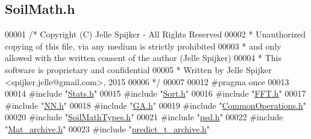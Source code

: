 \hypertarget{_soil_math_8h_source}{}\subsection{Soil\+Math.\+h}
\label{_soil_math_8h_source}

\begin{DoxyCode}
00001 \textcolor{comment}{/* Copyright (C) Jelle Spijker - All Rights Reserved}
00002 \textcolor{comment}{ * Unauthorized copying of this file, via any medium is strictly prohibited}
00003 \textcolor{comment}{ * and only allowed with the written consent of the author (Jelle Spijker)}
00004 \textcolor{comment}{ * This software is proprietary and confidential}
00005 \textcolor{comment}{ * Written by Jelle Spijker <spijker.jelle@gmail.com>, 2015}
00006 \textcolor{comment}{ */}
00007 
00012 \textcolor{preprocessor}{#pragma once}
00013 
00014 \textcolor{preprocessor}{#include "\hyperlink{_stats_8h}{Stats.h}"}
00015 \textcolor{preprocessor}{#include "\hyperlink{_sort_8h}{Sort.h}"}
00016 \textcolor{preprocessor}{#include "\hyperlink{_f_f_t_8h}{FFT.h}"}
00017 \textcolor{preprocessor}{#include "\hyperlink{_n_n_8h}{NN.h}"}
00018 \textcolor{preprocessor}{#include "\hyperlink{_g_a_8h}{GA.h}"}
00019 \textcolor{preprocessor}{#include "\hyperlink{_common_operations_8h}{CommonOperations.h}"}
00020 \textcolor{preprocessor}{#include "\hyperlink{_soil_math_types_8h}{SoilMathTypes.h}"}
00021 \textcolor{preprocessor}{#include "\hyperlink{psd_8h}{psd.h}"}
00022 \textcolor{preprocessor}{#include "\hyperlink{_mat__archive_8h}{Mat\_archive.h}"}
00023 \textcolor{preprocessor}{#include "\hyperlink{predict__t__archive_8h}{predict\_t\_archive.h}"}
\end{DoxyCode}
